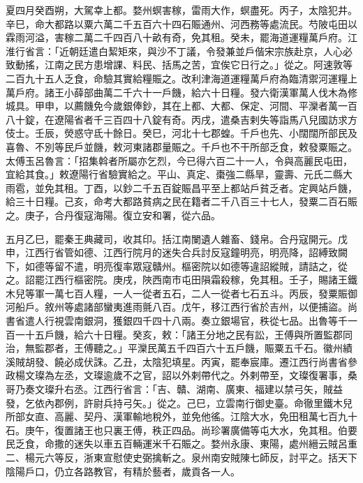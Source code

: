 \begin{pinyinscope}
 夏四月癸酉朔，大駕幸上都。婺州螟害稼，雷雨大作，螟盡死。丙子，太陰犯井。辛巳，命大都路以粟六萬二千五百六十四石賑通州、河西務等處流民。芍陂屯田以霖雨河溢，害稼二萬二千四百八十畝有奇，免其租。癸未，罷海道運糧萬戶府。江淮行省言：「近朝廷遣白絜矩來，與沙不丁議，令發兼並戶偕宋宗族赴京，人心必致動搖，江南之民方患增課、料民、括馬之苦，宜俟它日行之。」從之。阿速敦等二百九十五人乏食，命驗其實給糧賑之。改利津海道運糧萬戶府為臨清禦河運糧上萬戶府。諸王小薛部曲萬二千六十一戶饑，給六十日糧。發六衛漢軍萬人伐木為修城具。甲申，以薦饑免今歲銀俸鈔，其在上都、大都、保定、河間、平灤者萬一百八十錠，在遼陽省者千三百四十八錠有奇。丙戌，遣桑吉剌失等詣馬八兒國訪求方伎士。壬辰，熒惑守氐十餘日。癸巳，河北十七郡蝗。千戶也先、小闊闊所部民及喜魯、不別等民戶並饑，敕河東諸郡量賑之。千戶也不干所部乏食，敕發粟賑之。太傅玉呂魯言：「招集斡者所屬亦乞烈，今已得六百二十一人，令與高麗民屯田，宜給其食。」敕遼陽行省驗實給之。平山、真定、棗強二縣旱，靈壽、元氏二縣大雨雹，並免其租。丁酉，以鈔二千五百錠賑昌平至上都站戶貧乏者。定興站戶饑，給三十日糧。己亥，命考大都路貧病之民在籍者二千八百三十七人，發粟二百石賑之。庚子，合丹復寇海陽。復立安和署，從六品。



 五月乙巳，罷秦王典藏司，收其印。括江南闌遺人雜畜、錢帛。合丹寇開元。戊申，江西行省管如德、江西行院月的迷失合兵討反寇鐘明亮，明亮降，詔縛致闕下，如德等留不遣，明亮復率眾寇贛州。樞密院以如德等違詔縱賊，請詰之，從之。詔罷江西行樞密院。庚戌，陜西南市屯田隕霜殺稼，免其租。壬子，賜諸王鐵木兒等軍一萬七百人糧，一人一從者五石，二人一從者七石五斗。丙辰，發粟賑御河船戶。敘州等處諸部蠻夷進雨氈八百。戊午，移江西行省於吉州，以便捕盜。尚書省遣人行視雲南銀洞，獲銀四千四十八兩。奏立銀場官，秩從七品。出魯等千一百一十五戶饑，給六十日糧。癸亥，敕：「諸王分地之民有訟，王傅與所置監郡同治，無監郡者，王傅聽之。」平灤民萬五千四百六十五戶饑，賑粟五千石。徽州績溪賊胡發、饒必成伏誅。乙丑，太陰犯填星。丙寅，罷奉宸庫。遷江西行尚書省參政楊文璨為左丞，文璨逾歲不之官，詔以外剌帶代之。外剌帶至，文璨復署事，桑哥乃奏文璨升右丞。江西行省言：「吉、贛、湖南、廣東、福建以禁弓矢，賊益發，乞依內郡例，許尉兵持弓矢。」從之。己巳，立雲南行御史臺。命徹里鐵木兒所部女直、高麗、契丹、漢軍輸地稅外，並免他徭。江陰大水，免田租萬七百九十石。庚午，復置諸王也只裏王傅，秩正四品。尚珍署廣備等屯大水，免其租。伯要民乏食，命撒的迷失以車五百輛運米千石賑之。婺州永康、東陽，處州縉云賊呂重二、楊元六等反，浙東宣慰使史弼擒斬之。泉州南安賊陳七師反，討平之。括天下陰陽戶口，仍立各路教官，有精於藝者，歲貢各一人。




\end{pinyinscope}
